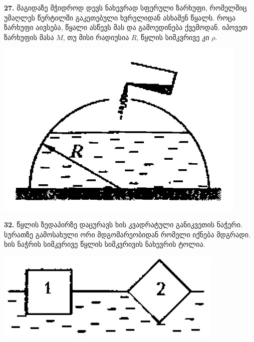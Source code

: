 \documentclass[12pt,a4paper,]{report}
\begin{document}
\textbf{27.} მაგიდაზე მჭიდროდ დევს ნახევრად სფერული ზარხუფი, რომელშიც უმაღლეს წერტილში გაკეთებული ხვრელიდან ასხამენ წყალს. როცა ზარხუფი აივსება, წყალი ასწევს მას და გამოედინება ქვემოდან. იპოვეთ ზარხუფის მასა $M$, თუ მისი რადიუსია $R$, წყლის სიმკვრივე კი $\rho$.
		\begin{center}
			\includegraphics[scale=0.3]{images/27.png}
		\end{center}
	
\textbf{32.} წყლის ზედაპირზე დაცურავს ხის კვადრატული განიკვეთის ნაჭერი. სურათზე გამოსახული ორი მდგომარეობიდან რომელი იქნება მდგრადი. ხის ნაჭრის სიმკვრივე წყლის სიმკვრივის ნახევრის ტოლია.
		\begin{center}
			\includegraphics[scale=0.5]{images/32.png}
		\end{center}
\end{document}
